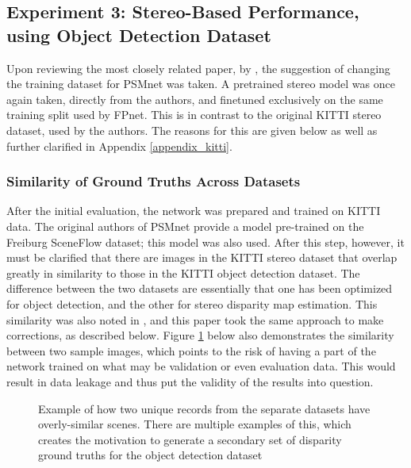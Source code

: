\subsection{Experiment 3: Stereo-Based Performance, using Object Detection Dataset}
Upon reviewing the most closely related paper, by \cite{wang_pseudo-lidar_2019}, the suggestion of changing the training dataset for PSMnet was taken. A pretrained stereo model was once again taken, directly from the authors, and finetuned exclusively on the same training split used by FPnet. This is in contrast to the original KITTI stereo dataset, used by the authors. The reasons for this are given below as well as further clarified in Appendix \ref{appendix_kitti}.

\subsubsection{Similarity of Ground Truths Across Datasets}
After the initial evaluation, the network was prepared and trained on KITTI data. The original authors of PSMnet provide a model pre-trained on the Freiburg SceneFlow dataset; this model was also used. After this step, however, it must be clarified that there are images in the KITTI stereo dataset that overlap greatly in similarity to those in the KITTI object detection dataset. The difference between the two datasets are essentially that one has been optimized for object detection, and the other for stereo disparity map estimation. This similarity was also noted in \cite{wang_pseudo-lidar_2019}, and this paper took the same approach to make corrections, as described below. Figure \ref{similarity_stereo_objdet} below also demonstrates the similarity between two sample images, which points to the risk of having a part of the network trained on what may be validation or even evaluation data. This would result in data leakage and thus put the validity of the results into question.

\begin{figure}[ht]
	\centering
	\caption{Example of how two unique records from the separate datasets have overly-similar scenes. There are multiple examples of this, which creates the motivation to generate a secondary set of disparity ground truths for the object detection dataset}
	\label{similarity_stereo_objdet}
\end{figure}

